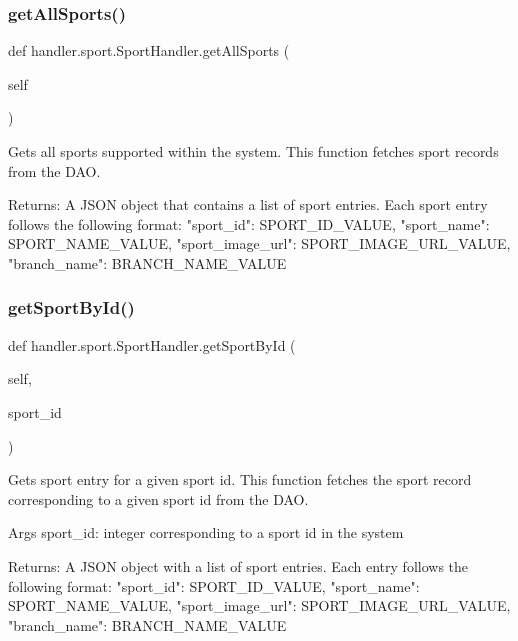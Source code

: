\subsubsection{\texorpdfstring{get\+All\+Sports()}{getAllSports()}}
{\footnotesize\ttfamily def handler.\+sport.\+Sport\+Handler.\+get\+All\+Sports (\begin{DoxyParamCaption}\item[{}]{self }\end{DoxyParamCaption})}

\begin{DoxyVerb}Gets all sports supported within the system.
This function fetches sport records from the DAO.

Returns:
    A JSON object that contains a list of sport entries.
    Each sport entry follows the following format:
{
    "sport_id": SPORT_ID_VALUE,
    "sport_name": SPORT_NAME_VALUE,
    "sport_image_url": SPORT_IMAGE_URL_VALUE,
    "branch_name": BRANCH_NAME_VALUE
}
\end{DoxyVerb}
 \mbox{\label{classhandler_1_1sport_1_1_sport_handler_a18849851d8f9daf78e2e879ac9806a20}} 
\subsubsection{\texorpdfstring{get\+Sport\+By\+Id()}{getSportById()}}
{\footnotesize\ttfamily def handler.\+sport.\+Sport\+Handler.\+get\+Sport\+By\+Id (\begin{DoxyParamCaption}\item[{}]{self,  }\item[{}]{sport\+\_\+id }\end{DoxyParamCaption})}

\begin{DoxyVerb}Gets sport entry for a given sport id.
This function fetches the sport record corresponding to a given sport id from the DAO.

Args
    sport_id: integer corresponding to a sport id in the system

Returns:
    A JSON object with a list of sport entries.
    Each entry follows the following format:
{
    "sport_id": SPORT_ID_VALUE,
    "sport_name": SPORT_NAME_VALUE,
    "sport_image_url": SPORT_IMAGE_URL_VALUE,
    "branch_name": BRANCH_NAME_VALUE
}
\end{DoxyVerb}
 \mbox{\label{classhandler_1_1sport_1_1_sport_handler_ad7fbc2c9ab7563cc23ca0b5a3d4820ab}} 
